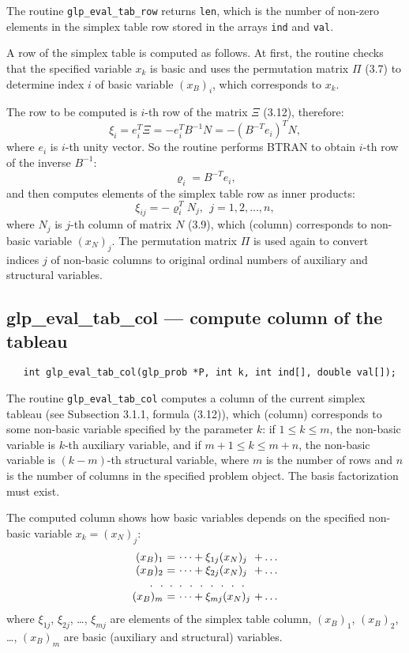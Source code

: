The routine \verb|glp_eval_tab_row| returns \verb|len|, which is the
number of non-zero elements in the simplex table row stored in the
arrays \verb|ind| and \verb|val|.


A row of the simplex table is computed as follows. At first, the
routine checks that the specified variable $x_k$ is basic and uses the
permutation matrix $\Pi$ (3.7) to determine index $i$ of basic variable
$(x_B)_i$, which corresponds to $x_k$.

The row to be computed is $i$-th row of the matrix $\Xi$ (3.12),
therefore:
$$\xi_i=e_i^T\Xi=-e_i^TB^{-1}N=-(B^{-T}e_i)^TN,$$
where $e_i$ is $i$-th unity vector. So the routine performs BTRAN to
obtain $i$-th row of the inverse $B^{-1}$:
$$\varrho_i=B^{-T}e_i,$$
and then computes elements of the simplex table row as inner products:
$$\xi_{ij}=-\varrho_i^TN_j,\ \ j=1,2,\dots,n,$$
where $N_j$ is $j$-th column of matrix $N$ (3.9), which (column)
corresponds to non-basic variable $(x_N)_j$. The permutation matrix
$\Pi$ is used again to convert indices $j$ of non-basic columns to
original ordinal numbers of auxiliary and structural variables.

\subsection{glp\_eval\_tab\_col --- compute column of the tableau}

\synopsis

\begin{verbatim}
   int glp_eval_tab_col(glp_prob *P, int k, int ind[], double val[]);
\end{verbatim}

\description

The routine \verb|glp_eval_tab_col| computes a column of the current
simplex tableau (see Subsection 3.1.1, formula (3.12)), which (column)
corresponds to some non-basic variable specified by the parameter $k$:
if $1\leq k\leq m$, the non-basic variable is $k$-th auxiliary
variable, and if $m+1\leq k\leq m+n$, the non-basic variable is
$(k-m)$-th structural variable, where $m$ is the number of rows and $n$
is the number of columns in the specified problem object. The basis
factorization must exist.

The computed column shows how basic variables depends on the specified
non-basic variable $x_k=(x_N)_j$:
$$
\begin{array}{r@{\ }c@{\ }l@{\ }l}
(x_B)_1&=&\dots+\xi_{1j}(x_N)_j&+\dots\\
(x_B)_2&=&\dots+\xi_{2j}(x_N)_j&+\dots\\
.\ \ .&.&.\ \ .\ \ .\ \ .\ \ .\ \ .\ \ .\\
(x_B)_m&=&\dots+\xi_{mj}(x_N)_j&+\dots\\
\end{array}
$$
where $\xi_{1j}$, $\xi_{2j}$, \dots, $\xi_{mj}$ are elements of the
simplex table column, $(x_B)_1$, $(x_B)_2$, \dots, $(x_B)_m$ are basic
(auxiliary and structural) variables.

